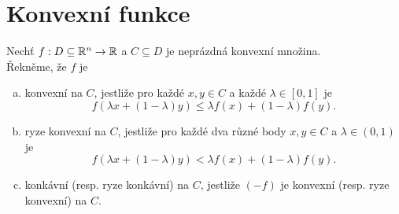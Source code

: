 \section{Konvexní funkce}\label{defKonv}

Nechť $f : D \subseteq \mathbb{R}^n \rightarrow \mathbb{R}$ a $C \subseteq D$ je neprázdná konvexní množina. \\
Řekněme, že $f$ je
\begin{enumerate}[(a)]
    \item konvexní na $C$, jestliže pro každé $x, y \in C$ a každé $\lambda \in [0,1]$ je
    \[
        f(\lambda x + (1-\lambda) y) \leq \lambda f(x) + (1-\lambda)f(y).
    \]
    \item ryze konvexní na $C$, jestliže pro každé dva různé body $x, y \in C$ a $\lambda \in (0,1)$ je
    \[
        f(\lambda x + (1-\lambda) y) < \lambda f(x) + (1-\lambda)f(y).
    \]
    \item konkávní (resp. ryze konkávní) na $C$, jestliže $(-f)$ je konvexní (resp. ryze konvexní) na $C$.
\end{enumerate}

